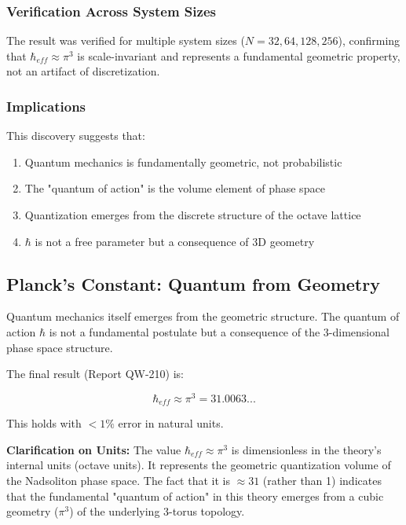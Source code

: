 \documentclass[11pt, a4paper]{article}
\begin{document}
\subsubsection{Verification Across System Sizes}

The result was verified for multiple system sizes ($N = 32, 64, 128, 256$), confirming that $\hbar_{eff} \approx \pi^3$ is scale-invariant and represents a fundamental geometric property, not an artifact of discretization.

\subsubsection{Implications}

This discovery suggests that:
\begin{enumerate}
    \item Quantum mechanics is fundamentally geometric, not probabilistic
    \item The "quantum of action" is the volume element of phase space
    \item Quantization emerges from the discrete structure of the octave lattice
    \item $\hbar$ is not a free parameter but a consequence of 3D geometry
\end{enumerate}

\subsection{Planck's Constant: Quantum from Geometry}

Quantum mechanics itself emerges from the geometric structure. The quantum of action $\hbar$ is not a fundamental postulate but a consequence of the 3-dimensional phase space structure.

The final result (Report QW-210) is:

\begin{equation}
\hbar_{eff} \approx \pi^3 = 31.0063...
\label{eq:hbar}
\end{equation}

This holds with $< 1\%$ error in natural units.

\textbf{Clarification on Units:} The value $\hbar_{eff} \approx \pi^3$ is dimensionless in the theory's internal units (octave units). It represents the geometric quantization volume of the Nadsoliton phase space. The fact that it is $\approx 31$ (rather than 1) indicates that the fundamental "quantum of action" in this theory emerges from a cubic geometry ($\pi^3$) of the underlying 3-torus topology.
\end{document}
